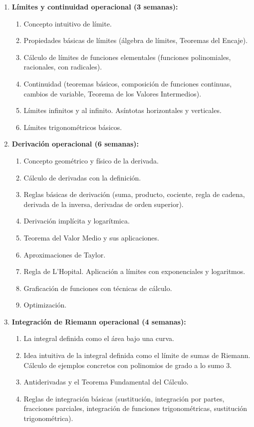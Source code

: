 \begin{refsection}
\begin{enumerate}
\item \textbf{Límites y continuidad operacional (3 semanas):} 
\begin{enumerate}
    \item Concepto intuitivo de límite.
    \item Propiedades básicas de límites (álgebra de límites, Teoremas del Encaje).
    \item Cálculo de límites de funciones elementales (funciones polinomiales, racionales, con radicales).
    \item Continuidad (teoremas básicos, composición de funciones continuas, cambios de variable, Teorema de los Valores Intermedios).
    \item Límites infinitos y al infinito. Asíntotas horizontales y verticales.
    \item Límites trigonométricos básicos.
\end{enumerate}

\item \textbf{Derivación operacional (6 semanas):} 
\begin{enumerate}
    \item Concepto geométrico y físico de la derivada.
    \item Cálculo de derivadas con la definición.
    \item Reglas básicas de derivación (suma, producto, cociente, regla de cadena, derivada de la inversa, derivadas de orden superior).
    \item Derivación implícita y logarítmica.
    \item Teorema del Valor Medio y sus aplicaciones.
    \item Aproximaciones de Taylor. 
    \item Regla de L'Hopital. Aplicación a límites con exponenciales y logaritmos. 
    \item Graficación de funciones con técnicas de cálculo.
    \item Optimización.
\end{enumerate}

\item \textbf{Integración de Riemann operacional (4 semanas):} 
\begin{enumerate}
    \item La integral definida como el área bajo una curva.
    \item Idea intuitiva de la integral definida como el límite de sumas de Riemann. Cálculo de ejemplos concretos con polinomios de grado a lo sumo 3.
    \item Antiderivadas y el Teorema Fundamental del Cálculo.
    \item Reglas de integración básicas (sustitución, integración por partes, fracciones parciales, integración de funciones trigonométricas, sustitución trigonométrica).
\end{enumerate}


\end{enumerate}
\end{refsection}
